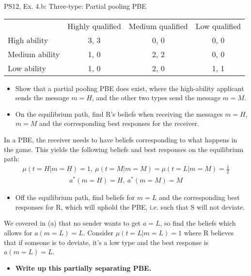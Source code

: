 \begin{frame}{PS12, Ex. 4.b: Three-type: Partial pooling PBE}
    \begin{table}
      \begin{tabular}{l|c|c|c|}
          \multicolumn{1}{c}{} & \multicolumn{1}{c}{Highly qualified} & \multicolumn{1}{c}{Medium qualified} & \multicolumn{1}{c}{Low qualified} \\\cline{2-4}
          High ability   & 3, 3 & 0, 0 & 0, 0 \\\cline{2-4}
          Medium ability & 1, 0 & 2, 2 & 0, 0 \\\cline{2-4}
          Low ability    & 1, 0 & 2, 0 & 1, 1 \\\cline{2-4}
      \end{tabular}
    \end{table}\vspace{-8pt}
    \begin{itemize}
      \item[(b)] Show that a partial pooling PBE does exist, where the high-ability applicant sends the message $m = H$, and the other two types send the message $m = M$.
      \item[Step 1:] On the equilibrium path, find R's beliefs when receiving the messages $m=H$, $m=M$ and the corresponding best responses for the receiver.
    \end{itemize}\vspace{-6pt}
    In a PBE, the receiver needs to have beliefs corresponding to what happens in the game. This yields the following beliefs and best responses on the equilibrium path:\vspace{-2pt}
    \begin{align*}
        \mu(t=H|m=H)=1,\
        \mu(t=M|m=M)=\mu(t=L|m=M)=\frac{1}{2}
    \end{align*}\vspace{-18pt}
    \begin{align*}
        a^*(m=H)=H,\ a^*(m=M)=M
    \end{align*}\vspace{-18pt}
    \begin{itemize}
      \item[Step 2:] Off the equilibrium path, find beliefs for $m=L$ and the corresponding best responses for R, which will uphold the PBE, i.e. such that S will not deviate.
    \end{itemize}\vspace{-6pt}
    We covered in (a) that no sender wants to get $a=L$, so find the beliefs which allows for $a(m=L)=L$. Consider $\mu(t=L|m=L)=1$ where R believes that if someone is to deviate, it's a low type and the best response is $a(m=L)=L$.\vspace{-2pt}
    \begin{itemize}
      \item[Step 3:] \textbf{Write up this partially separating PBE.}
    \end{itemize}\vspace{-10pt}
    \vfill\null
\end{frame}
